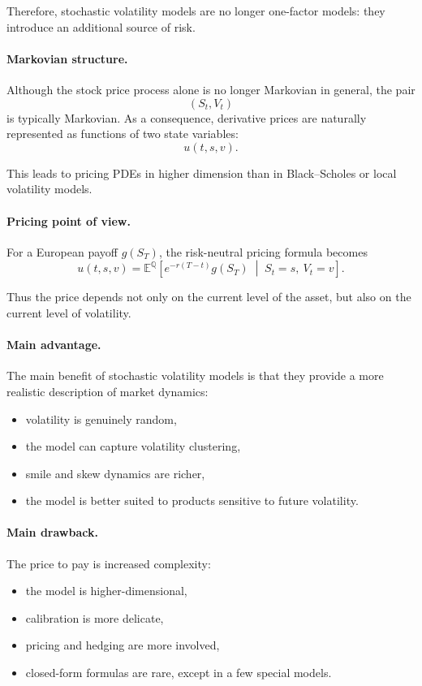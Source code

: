 \documentclass[11pt]{article}
\newcommand{\Qbb}{\mathbb{Q}}
\newcommand{\E}{\mathbb{E}}
\theoremstyle{plain}
\theoremstyle{definition}
\theoremstyle{remark}
\begin{document}
Therefore, stochastic volatility models are no longer one-factor models:
they introduce an additional source of risk.

\paragraph{Markovian structure.}
Although the stock price process alone is no longer Markovian in
general, the pair
\[
(S_t,V_t)
\]
is typically Markovian.
As a consequence, derivative prices are naturally represented as
functions of two state variables:
\[
u(t,s,v).
\]

This leads to pricing PDEs in higher dimension than in Black--Scholes or
local volatility models.

\paragraph{Pricing point of view.}
For a European payoff \(g(S_T)\), the risk-neutral pricing formula
becomes
\[
u(t,s,v)
=
\E^\Qbb\!\left[
e^{-r(T-t)}g(S_T)
\;\middle|\;
S_t=s,\ V_t=v
\right].
\]

Thus the price depends not only on the current level of the asset, but
also on the current level of volatility.

\paragraph{Main advantage.}
The main benefit of stochastic volatility models is that they provide a
more realistic description of market dynamics:
\begin{itemize}[leftmargin=1.4em]
    \item volatility is genuinely random,
    \item the model can capture volatility clustering,
    \item smile and skew dynamics are richer,
    \item the model is better suited to products sensitive to future
    volatility.
\end{itemize}

\paragraph{Main drawback.}
The price to pay is increased complexity:
\begin{itemize}[leftmargin=1.4em]
    \item the model is higher-dimensional,
    \item calibration is more delicate,
    \item pricing and hedging are more involved,
    \item closed-form formulas are rare, except in a few special models.
\end{itemize}
\end{document}
